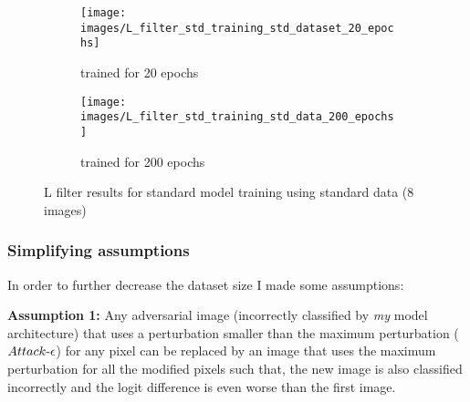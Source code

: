 \documentclass[../thesis.tex]{subfiles}
\begin{document}
	\begin{figure}
		\centering
		\begin{subfigure}{.5\textwidth}
			\centering
			\texttt{[image: images/L\_filter\_std\_training\_std\_dataset\_20\_epochs]}
			\caption{trained for 20 epochs}
			\label{fig:lfilterstdtrainingstddataset20epochs}
		\end{subfigure}%
		\begin{subfigure}{.5\textwidth}
			\centering
			\texttt{[image: images/L\_filter\_std\_training\_std\_data\_200\_epochs]}
			\caption{trained for 200 epochs}
			\label{fig:lfilterstdtrainingstddata200epochs}
		\end{subfigure}
		\caption{L filter results for standard model training using standard data (8 images)}
		\label{fig:standard_L_filters}
	\end{figure}
	
	\subsubsection{Simplifying assumptions}
	
	In order to further decrease the dataset size I made some assumptions: 
	
	\textbf{Assumption 1:} Any adversarial image (incorrectly classified by \textit{my} model architecture) that uses a perturbation smaller than the maximum perturbation ($Attack\text{-}\epsilon$) for any pixel can be replaced by an image that uses the maximum perturbation for all the modified pixels such that, the new image is also classified incorrectly and the logit difference is even worse than the first image. 
	
\end{document}
